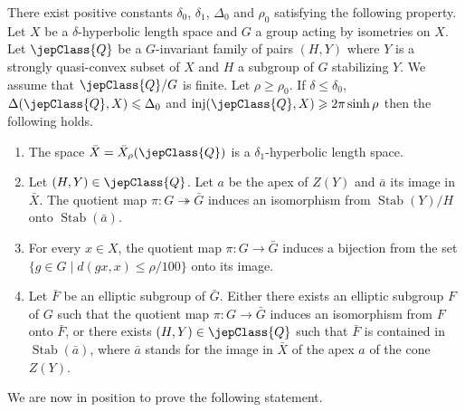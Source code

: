 \begin{theorem}\label{thm:smallcancellation}
There exist positive constants $\delta_0$, $\delta_1$, $\Delta_0$ and $\rho_0$ satisfying the following property. Let $X$ be a $\delta$-hyperbolic length space and $G$ a group acting by isometries on $X$. Let $\jepClass{Q}$ be a $G$-invariant family of pairs $(H,Y)$ where $Y$ is a strongly quasi-convex subset of $X$ and $H$ a subgroup of $G$ stabilizing $Y$. We assume that $\jepClass{Q}/G$ is finite. Let $\rho\geqslant\rho_0$. If $\delta\leqslant\delta_0$, $\Delta(\jepClass{Q},X)\leqslant\Delta_0$ and $\operatorname{inj}(\jepClass{Q},X)\geqslant2\pi\sinh\rho$ then the following holds.
\begin{enumerate}
\item The space $\bar X=\bar X_\rho(\jepClass{Q})$ is a $\delta_1$-hyperbolic length space.
\item Let $(H,Y)\in\jepClass{Q}$. Let $a$ be the apex of $Z(Y)$ and $\bar a$ its image in $\bar X$. The quotient map $\pi:G\twoheadrightarrow\bar G$ induces an isomorphism from $\operatorname{Stab}(Y)/H$ onto $\operatorname{Stab}(\bar a)$.
\item For every $x\in X$, the quotient map $\pi:G\to\bar G$ induces a bijection from the set $\{g\in G\mid d(gx,x)\leqslant\rho/100\}$ onto its image.
\item Let $\bar F$ be an elliptic subgroup of $\bar G$. Either there exists an elliptic subgroup $F$ of $G$ such that the quotient map $\pi:G\to\bar G$ induces an isomorphism from $F$ onto $\bar F$, or there exists $(H,Y)\in\jepClass{Q}$ such that $\bar F$ is contained in $\operatorname{Stab}(\bar a)$, where $\bar a$ stands for the image in $\bar X$ of the apex $a$ of the cone $Z(Y)$.
\end{enumerate}
\end{theorem}
We are now in position to prove the following statement.

